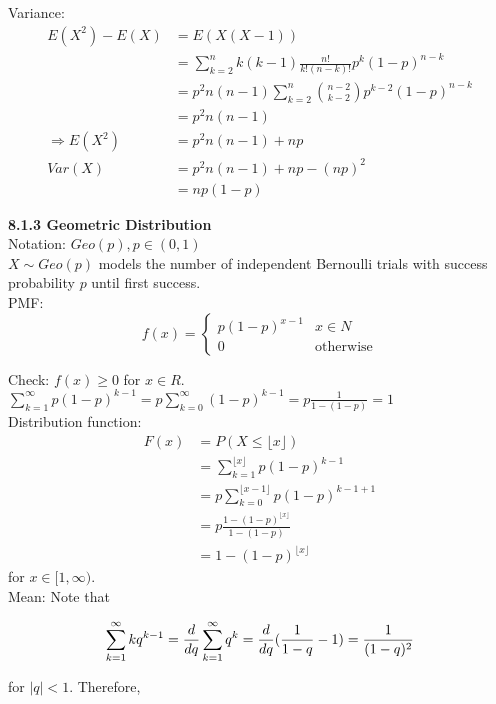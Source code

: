 \documentclass[10pt,letterpaper]{article}
\begin{document}
    Variance: 
				\begin{align*}
				E(X^2)-E(X)&=E(X(X-1))\\
				&=\sum_{k=2}^{n}k(k-1)\frac{n!}{k!(n-k)!}p^k(1-p)^{n-k}\\
				&=p^2n(n-1)\sum_{k=2}^{n}\binom{n-2}{k-2}p^{k-2}(1-p)^{n-k}\\
				&=p^2n(n-1)\\
				\Rightarrow E(X^2)&=p^2n(n-1)+np\\
				Var(X)&=p^2n(n-1)+np-(np)^2\\
				&=np(1-p)
			\end{align*}
			
\pagebreak
	
\textbf{8.1.3 Geometric Distribution}\\

    Notation: $Geo(p), p\in(0, 1)$\\

    $X\sim Geo(p)$ models the number of independent Bernoulli trials with success probability $p$ until first success.\\

    PMF: \[f(x)=\begin{cases}
							p(1-p)^{x-1}&x\in N\\
							0&\mbox{otherwise}
						\end{cases}\]

    Check: $f(x)\geq 0$ for $x\in R$. $\sum_{k=1}^{\infty}p(1-p)^{k-1}=p\sum_{k=0}^{\infty}(1-p)^{k-1}=p\frac{1}{1-(1-p)}=1$\\

    Distribution function:
					\begin{align*}
						F(x)&=P(X\leq\lfloor x\rfloor)\\
						&=\sum_{k=1}^{\lfloor x\rfloor}p(1-p)^{k-1}\\
						&=p\sum_{k=0}^{\lfloor x-1\rfloor}p(1-p)^{k-1+1}\\
						&=p\frac{1-(1-p)^{\lfloor x\rfloor}}{1-(1-p)}\\
						&=1-(1-p)^{\lfloor x\rfloor}
					\end{align*}
					for $x\in[1, \infty)$.\\

    Mean: Note that
					
						$$\sum_{k=1}^{\infty}kq^{k-1}=\frac{d}{dq}\sum_{k=1}^{\infty}q^k
						=\frac{d}{dq}(\frac{1}{1-q}-1)\\
						=\frac{1}{(1-q)^2}$$
					
					for $|q|<1$. Therefore,
					
\end{document}
